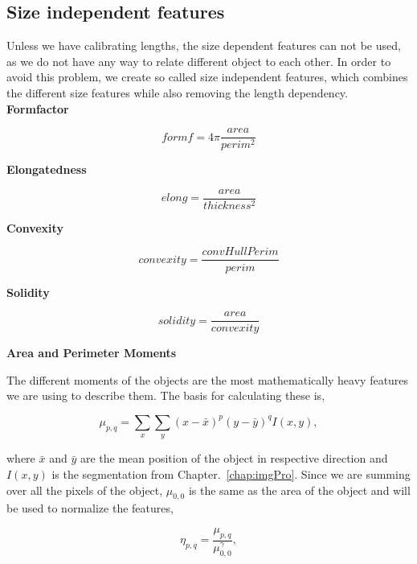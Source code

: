 \subsection{Size independent features}

Unless we have calibrating lengths, the size dependent features can not be used, as we do not have any way to relate different object to each other. In order to avoid this problem, we create so called size independent features, which combines the different size features while also removing the length dependency.\\

\textbf{Formfactor}

\begin{equation}
    formf = 4\pi\frac{area}{perim^2}
\end{equation}

\textbf{Elongatedness}

\begin{equation}
    elong = \frac{area}{thickness^2}
\end{equation}

\textbf{Convexity}

\begin{equation}
    convexity = \frac{convHullPerim}{perim}
\end{equation}

\textbf{Solidity}

\begin{equation}
    solidity = \frac{area}{convexity}
\end{equation}

\textbf{Area and Perimeter Moments}

The different moments of the objects are the most mathematically heavy features we are using to describe them. The basis for calculating these is,

\begin{equation}
    \mu_{p,q} = \sum_x \sum_y (x-\bar{x})^p (y-\bar{y})^qI(x,y),
\end{equation}

where $\bar{x}$ and $\bar{y}$ are the mean position of the object in respective direction and $I(x,y)$ is the segmentation from Chapter.~\ref{chap:imgPro}. Since we are summing over all the pixels of the object, $\mu_{0,0}$ is the same as the area of the object and will be used to normalize the features,

\begin{equation}
    \eta_{p,q} = \frac{\mu_{p,q}}{\mu_{0,0}^{\gamma}},
\end{equation}

